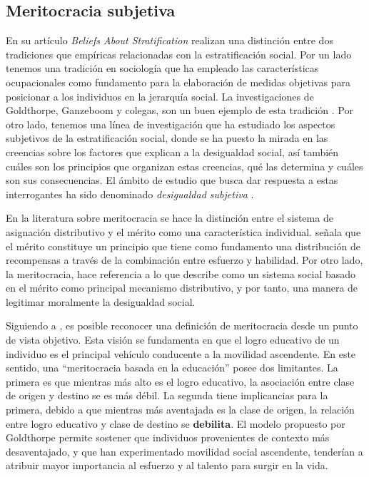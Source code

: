 \documentclass[12pt]{article}
\begin{document}
\subsection{Meritocracia subjetiva}

En su artículo \textit{Beliefs About Stratification} \citet{Smith1981} realizan una distinción entre dos tradiciones que empíricas relacionadas con la estratificación social.  Por un lado tenemos una tradición en sociología que ha empleado las características ocupacionales como fundamento para la elaboración de medidas objetivas para posicionar a los individuos en la jerarquía social. La investigaciones de Goldthorpe, Ganzeboom y colegas, son un buen ejemplo de esta tradición \citep{Goldthorpe2003,Ganzeboom1991}. Por otro lado, tenemos una línea de investigación que ha estudiado los aspectos subjetivos de la estratificación social, donde se ha puesto la mirada en las creencias sobre los factores que explican a la desigualdad social, así también cuáles son los principios que organizan estas creencias, qué las determina y cuáles son sus consecuencias. El ámbito de estudio que busca dar respuesta a estas interrogantes ha sido denominado \textit{desigualdad subjetiva} \citep{Smith1981}.

En la literatura sobre meritocracia se hace la distinción entre el sistema de asignación distributivo y el mérito como una característica individual. \citet{Sen2000} señala que el mérito constituye un principio que tiene como fundamento una distribución de recompensas a través de la combinación entre esfuerzo y habilidad. Por otro lado, la meritocracia, hace referencia a lo que \citet{Young1961} describe como un sistema social basado en el mérito como principal mecanismo distributivo, y por tanto, una manera de legitimar moralmente la desigualdad social. 

Siguiendo a \citet{Goldthorpe2003}, es posible reconocer una definición de meritocracia desde un punto de vista objetivo. Esta visión se fundamenta en que el logro educativo de un individuo es el principal vehículo conducente a la movilidad ascendente. En este sentido, una ``meritocracia basada en la educación'' posee dos limitantes. La primera es que mientras más alto es el logro educativo, la asociación entre clase de origen y destino se es más débil. La segunda tiene implicancias para la primera, debido a que mientras más aventajada es la clase de origen, la relación entre logro educativo y clase de destino se \textbf{debilita}. El modelo propuesto por Goldthorpe permite sostener que individuos provenientes de contexto más desaventajado, y que han experimentado movilidad social ascendente, tenderían a atribuir mayor importancia al esfuerzo y al talento para surgir en la vida. 
\end{document}
